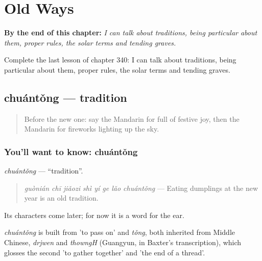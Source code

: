 
\chapter{Old Ways}
\label{ch:zh-old-ways}

\begin{chapteropening}
\textbf{By the end of this chapter:} \emph{I can talk about traditions, being particular about them, proper rules, the solar terms and tending graves.}

Complete the last lesson of chapter 340: I can talk about traditions, being particular about them, proper rules, the solar terms and tending graves.
\end{chapteropening}

\section[chuántǒng]{chuántǒng — tradition}

\label{lesson:ZH-C340-chuantong}



\begin{quote}
Before the new one: say the Mandarin for full of festive joy, then the Mandarin for fireworks lighting up the sky.
\end{quote}

\subsection*{You'll want to know: chuántǒng}
\emph{chuántǒng} — \textquotedblleft{}tradition\textquotedblright{}.

\begin{quote}
\emph{guònián chī jiǎozi shì yí ge lǎo chuántǒng} — Eating dumplings at the new year is an old tradition.
\end{quote}

Its characters come later; for now it is a word for the ear.

\begin{cousinweb}
\emph{chuántǒng} is built from  'to pass on' and \emph{tǒng}, both inherited from Middle Chinese, \emph{drjwen} and \emph{thowngH} (Guangyun, in Baxter's transcription), which glosses the second 'to gather together' and 'the end of a thread'.
\end{cousinweb}

